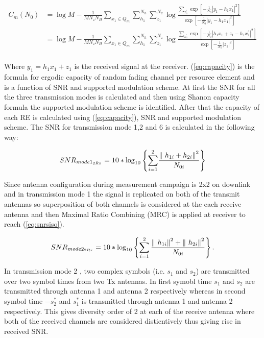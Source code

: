 \documentclass[a4paper,10pt]{article}
\begin{document}
\begin{align}
C_m\left(N_0\right)
&=\log M-\frac{1}{MN_{z}N_{H}}\sum_{x_{1}\in{Q_m}}\sum_{h_1}^{N_{h}}\sum_{z_{1}}^{N_{z}}\log\frac{\sum_{x^{'}_{1}}\exp\left[-\frac{1}{N_{0}}\left|y_{1}-h_{1}x^{'}_{1}\right|^2\right]}{\exp\left[-\frac{1}{N_{0}}\left|y_{1}-h_{1}x_{1}\right|^{2}\right]}\nonumber\\
&=\log M-\frac{1}{MN_{z}N_{H}}\sum_{x_{1}\in{Q_m}}\sum_{h_1}^{N_{h}}\sum_{z_{1}}^{N_{z}}\log\frac{\sum_{x^{'}_{1}}\exp\left[-\frac{1}{N_{0}}\left|h_{1}x_{1} + z_1 - h_1x^{'}_{1}\right|^2\right]}{\exp\left[-\frac{1}{N_{0}}\left|z_{1}\right|^{2}\right]}\nonumber\\
\label{eq:capacity}
\end{align}

Where $y_1 = h_1x_1 + z_1$ is the received signal at the receiver. (\ref{eq:capacity}) is the formula for ergodic capacity of random fading channel per resource element and is a function of SNR and supported modulation scheme. At first the SNR for all the three transmission modes is calculated and then using Shanon capacity formula the supported modulation scheme is identified. After that the capacity of each RE is calculated using (\ref{eq:capacity}), SNR and supported modulation scheme. The SNR for transmission mode 1,2 and 6 is calculated in the following way:

\begin{equation} \label{eq:snrsiso}
SNR_{mode1_{2Rx}} = 10*{\mathrm{log}}_{10} \left\lbrace {\sum_{i=1}^2} {\frac{{\| \ {h_{1i}} + {h_{2i}} \| \\}^2}{N_{0i}}}\right\rbrace
\end{equation}

Since antenna configuration during measurement campaign is 2x2 on downlink and in transmission mode 1 the signal is replicated on both of the transmit antennas so superposition of both channels is considered at the each receive antenna and then Maximal Ratio Combining (MRC) is applied at receiver to reach (\ref{eq:snrsiso}). 
 
\begin{equation} \label{eq:snralam}
SNR_{mode2_{2Rx}} = 10* {\mathrm{log}}_{10} \left\lbrace {\sum_{i=1}^2} \, {\frac{ {\| \ {h_{1i}} \| \\}^2 +  {\| \ {h_{2i}} \| \\}^2 }{N_{0i}}}\right\rbrace. 
\end{equation}

In transmission mode 2 , two complex symbols (i.e. $s_1$ and $s_2$) are transmitted over two symbol times from two Tx antennas. In first symobl time $s_1$ and $s_2$ are transmitted through antenna 1 and antenna 2 respectively whereas in second symbol time $-{s_{2}^{*}}$ and ${s_{1}^{*}}$ is transmitted through antenna 1 and antenna 2 respectively. This gives diversity order of 2 at each of the receive antenna where both of the received channels are considered disticntively thus giving rise in received SNR. 
\end{document}
